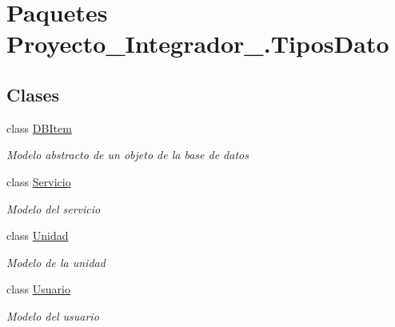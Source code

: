 \hypertarget{namespace_proyecto___integrador__3_1_1_tipos_dato}{\section{Paquetes Proyecto\-\_\-\-Integrador\-\_.\-Tipos\-Dato}
\label{namespace_proyecto___integrador__3_1_1_tipos_dato}
}
\subsection*{Clases}
\begin{DoxyCompactItemize}
\item 
class \hyperlink{class_proyecto___integrador__3_1_1_tipos_dato_1_1_d_b_item}{D\-B\-Item}
\begin{DoxyCompactList}\small\item\em Modelo abstracto de un objeto de la base de datos \end{DoxyCompactList}\item 
class \hyperlink{class_proyecto___integrador__3_1_1_tipos_dato_1_1_servicio}{Servicio}
\begin{DoxyCompactList}\small\item\em Modelo del servicio \end{DoxyCompactList}\item 
class \hyperlink{class_proyecto___integrador__3_1_1_tipos_dato_1_1_unidad}{Unidad}
\begin{DoxyCompactList}\small\item\em Modelo de la unidad \end{DoxyCompactList}\item 
class \hyperlink{class_proyecto___integrador__3_1_1_tipos_dato_1_1_usuario}{Usuario}
\begin{DoxyCompactList}\small\item\em Modelo del usuario \end{DoxyCompactList}\end{DoxyCompactItemize}
